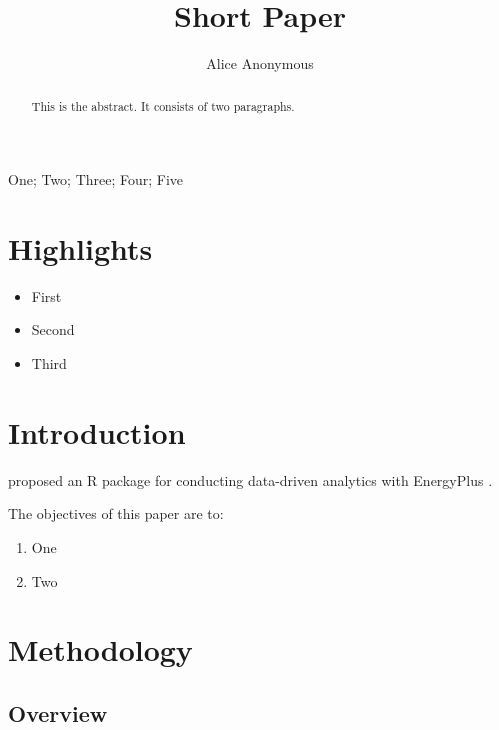 \documentclass[number]{elsarticle} %
\providecommand{\tightlist}{%
  \setlength{\itemsep}{0pt}\setlength{\parskip}{0pt}}
\begin{document}
\begin{frontmatter}

  \title{Short Paper}
    \author[Some Institute]{Alice Anonymous}
      \address[Some Institute]{Department, Street, City, State, Zip}
  
  \begin{abstract}
  This is the abstract.
  It consists of two paragraphs.
  \end{abstract}
   \begin{keyword} One; Two; Three; Four; Five\end{keyword}
 \end{frontmatter}

\hypertarget{highlights}{%
\section*{Highlights}\label{highlights}}

\begin{itemize}
\tightlist
\item
  First
\item
  Second
\item
  Third
\end{itemize}

\hypertarget{introduction}{%
\section{Introduction}\label{introduction}}

\citet{jia2021eplusr} proposed an R package for conducting data-driven analytics with
EnergyPlus \citep{crawley2001energyplus}.

The objectives of this paper are to:

\begin{enumerate}
\def\labelenumi{\arabic{enumi}.}
\tightlist
\item
  One
\item
  Two
\end{enumerate}

\hypertarget{methodology}{%
\section{Methodology}\label{methodology}}

\hypertarget{overview}{%
\subsection{Overview}\label{overview}}
\end{document}
